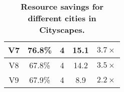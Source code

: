 \begin{table}[t]
\begin{tabular}{|c|c|c|c|c|}
V7                                                                      & 76.8\%                    & 4           & 15.1                 & $3.7\times$                                                                 \\ \hline
V8                                                                      & 67.8\%                    & 4           & 14.2                 & $3.5\times$                                                                 \\ \hline
V9                                                                      & 67.9\%                    & 4           & 8.9                  & $2.2\times$                                                                \\ \hline
\end{tabular}
\caption{\bf\small Resource savings for different cities in Cityscapes.}
\label{tab:resource-savings-final}
\end{table}